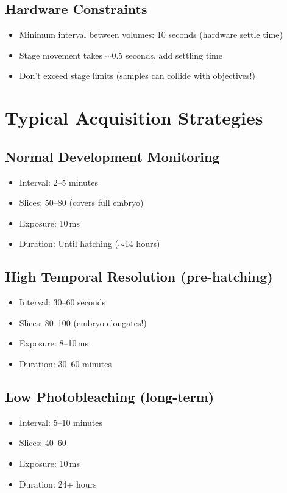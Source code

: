 \documentclass[11pt,letterpaper]{article}
\begin{document}
\subsection{Hardware Constraints}
\begin{itemize}
    \item Minimum interval between volumes: 10 seconds (hardware settle time)
    \item Stage movement takes $\sim$0.5 seconds, add settling time
    \item Don't exceed stage limits (samples can collide with objectives!)
\end{itemize}

\section{Typical Acquisition Strategies}

\subsection{Normal Development Monitoring}
\begin{itemize}
    \item Interval: 2--5 minutes
    \item Slices: 50--80 (covers full embryo)
    \item Exposure: 10\,ms
    \item Duration: Until hatching ($\sim$14 hours)
\end{itemize}

\subsection{High Temporal Resolution (pre-hatching)}
\begin{itemize}
    \item Interval: 30--60 seconds
    \item Slices: 80--100 (embryo elongates!)
    \item Exposure: 8--10\,ms
    \item Duration: 30--60 minutes
\end{itemize}

\subsection{Low Photobleaching (long-term)}
\begin{itemize}
    \item Interval: 5--10 minutes
    \item Slices: 40--60
    \item Exposure: 10\,ms
    \item Duration: 24+ hours
\end{itemize}
\end{document}
